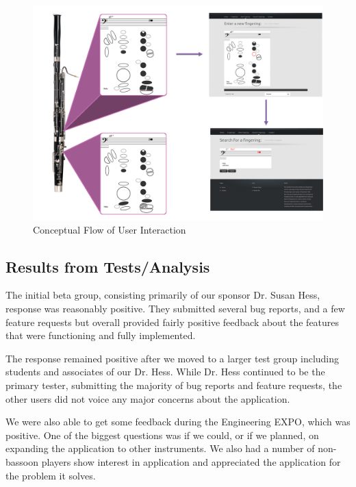 \documentclass[12pt,english]{article}
\begin{document}
\begin{figure}[H]
\caption{Conceptual Flow of User Interaction}


\begin{centering}
\includegraphics[scale=0.15]{flow}
\par\end{centering}

\centering{}
\end{figure}



\subsection{Results from Tests/Analysis}

The initial beta group, consisting primarily of our sponsor Dr. Susan
Hess, response was reasonably positive. They submitted several bug
reports, and a few feature requests but overall provided fairly positive
feedback about the features that were functioning and fully implemented.

The response remained positive after we moved to a larger test group
including students and associates of our Dr. Hess. While Dr. Hess
continued to be the primary tester, submitting the majority of bug
reports and feature requests, the other users did not voice any major
concerns about the application.

We were also able to get some feedback during the Engineering EXPO,
which was positive. One of the biggest questions was if we could,
or if we planned, on expanding the application to other instruments.
We also had a number of non-bassoon players show interest in application
and appreciated the application for the problem it solves.
\end{document}
